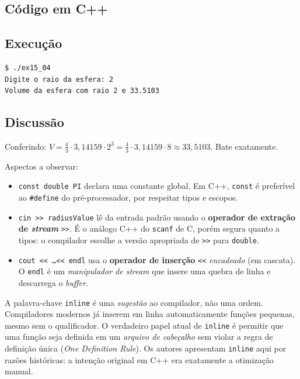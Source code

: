 \documentclass[11pt,a4paper]{article}
\begin{document}
\subsection*{C\'odigo em C++}



\subsection*{Execu\c{c}\~ao}

\begin{saidabox}
\begin{verbatim}
$ ./ex15_04
Digite o raio da esfera: 2
Volume da esfera com raio 2 e 33.5103
\end{verbatim}
\end{saidabox}

\subsection*{Discuss\~ao}

Conferindo: $V = \tfrac{4}{3} \cdot 3{,}14159 \cdot 2^3 = \tfrac{4}{3} \cdot 3{,}14159 \cdot 8 \approx 33{,}5103$. Bate exatamente.

Aspectos a observar:

\begin{itemize}[leftmargin=*,itemsep=0pt]
  \item \texttt{const double PI} declara uma constante global. Em C++, \texttt{const} \'e prefer\'ivel ao \texttt{\#define} do pr\'e-processador, por respeitar tipos e escopos.
  \item \texttt{cin >> radiusValue} l\^e da entrada padr\~ao usando o \textbf{operador de extra\c{c}\~ao de \emph{stream}} \texttt{>>}. \'E o an\'alogo C++ do \texttt{scanf} de C, por\'em segura quanto a tipos: o compilador escolhe a vers\~ao apropriada de \texttt{>>} para \texttt{double}.
  \item \texttt{cout << \ldots << endl} usa o \textbf{operador de inser\c{c}\~ao} \texttt{<<} \emph{encadeado} (em cascata). O \texttt{endl} \'e um \emph{manipulador de \emph{stream}} que insere uma quebra de linha e descarrega o \emph{buffer}.
\end{itemize}

\begin{obseng}
A palavra-chave \texttt{inline} \'e uma \emph{sugest\~ao} ao compilador, n\~ao uma ordem. Compiladores modernos j\'a inserem em linha automaticamente fun\c{c}\~oes pequenas, mesmo sem o qualificador. O verdadeiro papel atual de \texttt{inline} \'e permitir que uma fun\c{c}\~ao seja definida em um \emph{arquivo de cabe\c{c}alho} sem violar a regra de defini\c{c}\~ao \'unica (\emph{One Definition Rule}). Os autores apresentam \texttt{inline} aqui por raz\~oes hist\'oricas: a inten\c{c}\~ao original em C++ era exatamente a otimiza\c{c}\~ao manual.
\end{obseng}
\end{document}
